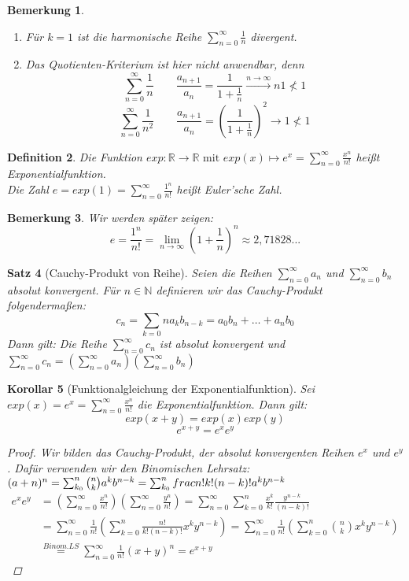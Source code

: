 \documentclass[a4paper,titlepage,oneside]{article}
\def\N{\ensuremath{\mathbb{N}} }
\def\R{\ensuremath{\mathbb{R}} }
\def\e{\ensuremath{\mathit{e}} }
\newcommand{\suminf}[2][n]{\ensuremath{\sum_{#1= 0}^{\infty}{#2}}}
\renewcommand{\liminf}[2][n]{\ensuremath{\lim\limits_{#1 \rightarrow \infty}{#2}}}
\newcommand{\longtoinf}[1][n]{\ensuremath{\overset{\scriptscriptstyle{#1 \to \infty}}{\longrightarrow}}}
\theoremstyle{thmstyle}
\newtheorem{satz}{Satz}[subsection]
\newtheorem{korr}[satz]{Korollar}
\newtheorem{defi}[satz]{Definition}
\newtheorem{bem}[satz]{Bemerkung}
\begin{document}
\begin{bem}
\begin{enumerate}
\item Für \(k = 1\) ist die harmonische Reihe \suminf{\frac{1}{n}} divergent.
\item Das Quotienten-Kriterium ist hier nicht anwendbar, denn \\
\[\suminf{\frac{1}{n}} \qquad \frac{a_{n+1}}{a_n} = \frac{1}{1 + \frac{1}{n}} \longtoinf{n} 1 \not < 1\]
\[\suminf{\frac{1}{n^2}} \qquad \frac{a_{n+1}}{a_n} = \left(\frac{1}{1 + \frac{1}{n}}\right)^2 \longrightarrow 1 \not < 1\]
\end{enumerate}
\end{bem}

\begin{defi}
Die Funktion \(exp: \R \to \R \text{ mit } exp(x) \mapsto \e^x = \suminf{\frac{x^n}{n!}}\) heißt Exponentialfunktion.\\
Die Zahl \(\e = exp(1) = \suminf{\frac{1^n}{n!}} \) heißt Euler'sche Zahl.
\end{defi}

\begin{bem}
Wir werden später zeigen:
\[\e = \frac{1^n}{n!} = \liminf{\left(1 + \frac{1}{n}\right)^n} \approx 2,71828...\]
\end{bem}

\begin{satz}[Cauchy-Produkt von Reihe]
Seien die Reihen \suminf{a_n} und \suminf{b_n} absolut konvergent. Für $n \in \N$ definieren wir das Cauchy-Produkt folgendermaßen:
\[c_n = \sum_{k = 0}{n}{a_kb_{n-k}} = a_0b_n + \dots + a_nb_0\]
Dann gilt: Die Reihe \suminf{c_n} ist absolut konvergent und $\suminf{c_n} = \left( \suminf{a_n} \right)  \left( \suminf{b_n} \right) $
\proof[Beweisidee]
\end{satz}

\begin{korr}[Funktionalgleichung der Exponentialfunktion]
Sei $exp(x) = \e^x = \suminf{\frac{x^n}{n!}}$ die Exponentialfunktion. Dann gilt:
\[exp(x+y) = exp(x) exp(y)\]
\[e^{x+y} = e^x e^y\]
\begin{proof}
Wir bilden das Cauchy-Produkt, der absolut konvergenten Reihen $e^x$ und $ e^y$. Dafür verwenden wir den Binomischen Lehrsatz: $(a+n)^n = \sum_{k_0}^{n}{\binom{n}{k}a^kb^{n-k}} = \sum_{k_0}^{n}{\\frac{n!}{k!(n-k)!}a^kb^{n-k}}$\\
\begin{math} \displaystyle
\begin{aligned}
e^x e^y &= \left(\suminf{\frac{x^n}{n!}}\right)\left(\suminf{\frac{y^n}{n!}}\right) = \suminf{\sum_{k = 0}^{n}{\frac{x^k}{k!}\frac{y^{n-k}}{(n-k)!}}} \\
&= \suminf{\frac{1}{n!}\left(\sum_{k = 0}^{n}{\frac{n!}{k!(n-k)!}x^ky^{n-k}}\right)} = \suminf{\frac{1}{n!}\left(\sum_{k = 0}^{n}{\binom{n}{k}x^ky^{n-k}}\right)}\\
& \overset{Binom.LS}{=} \suminf{\frac{1}{n!}(x+y)^n} = e^{x+y}
\end{aligned}
\end{math}
\end{proof}
\end{korr}
\end{document}
